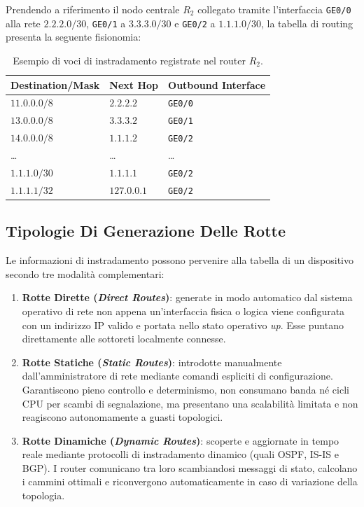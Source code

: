 \documentclass[11pt, a4paper]{article}
\begin{document}

Prendendo a riferimento il nodo centrale $R_2$ collegato tramite l'interfaccia \texttt{GE0/0} alla rete $2.2.2.0/30$, \texttt{GE0/1} a $3.3.3.0/30$ e \texttt{GE0/2} a $1.1.1.0/30$, la tabella di routing presenta la seguente fisionomia:

\begin{table}[H]
\centering
\caption{Esempio di voci di instradamento registrate nel router $R_2$.}
\label{tab:routing_table_r2}
\begin{tabularx}{\textwidth}{l l X}
\toprule
\textbf{Destination/Mask} & \textbf{Next Hop} & \textbf{Outbound Interface} \\
\midrule
$11.0.0.0/8$ & $2.2.2.2$ & \texttt{GE0/0} \\
$13.0.0.0/8$ & $3.3.3.2$ & \texttt{GE0/1} \\
$14.0.0.0/8$ & $1.1.1.2$ & \texttt{GE0/2} \\
\dots & \dots & \dots \\
$1.1.1.0/30$ & $1.1.1.1$ & \texttt{GE0/2} \\
$1.1.1.1/32$ & $127.0.0.1$ & \texttt{GE0/2} \\
\bottomrule
\end{tabularx}
\end{table}

\subsection{Tipologie Di Generazione Delle Rotte}

Le informazioni di instradamento possono pervenire alla tabella di un dispositivo secondo tre modalità complementari:


\begin{enumerate}
    \item \textbf{Rotte Dirette (\emph{Direct Routes})}: generate in modo automatico dal sistema operativo di rete non appena un'interfaccia fisica o logica viene configurata con un indirizzo IP valido e portata nello stato operativo \emph{up}. Esse puntano direttamente alle sottoreti localmente connesse.
    \item \textbf{Rotte Statiche (\emph{Static Routes})}: introdotte manualmente dall'amministratore di rete mediante comandi espliciti di configurazione. Garantiscono pieno controllo e determinismo, non consumano banda né cicli CPU per scambi di segnalazione, ma presentano una scalabilità limitata e non reagiscono autonomamente a guasti topologici.
    \item \textbf{Rotte Dinamiche (\emph{Dynamic Routes})}: scoperte e aggiornate in tempo reale mediante protocolli di instradamento dinamico (quali OSPF, IS-IS e BGP). I router comunicano tra loro scambiandosi messaggi di stato, calcolano i cammini ottimali e riconvergono automaticamente in caso di variazione della topologia.
\end{enumerate}
\end{document}
